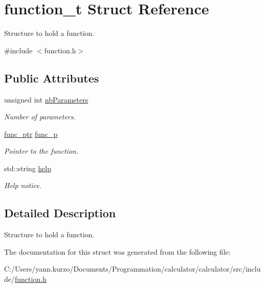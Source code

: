 \hypertarget{structfunction__t}{}\section{function\+\_\+t Struct Reference}
\label{structfunction__t}


Structure to hold a function.  




{\ttfamily \#include $<$function.\+h$>$}

\subsection*{Public Attributes}
\begin{DoxyCompactItemize}
\item 
\hypertarget{structfunction__t_a647add70a5264bc6bea452726cae9591}{}unsigned int \hyperlink{structfunction__t_a647add70a5264bc6bea452726cae9591}{nb\+Parameters}\label{structfunction__t_a647add70a5264bc6bea452726cae9591}

\begin{DoxyCompactList}\small\item\em Number of parameters. \end{DoxyCompactList}\item 
\hypertarget{structfunction__t_ab2d1eb30ebe6c02fdd6b10c1a2241f5a}{}\hyperlink{function_8h_a171e664ee3179d3d1f1a7b04a747724c}{func\+\_\+ptr} \hyperlink{structfunction__t_ab2d1eb30ebe6c02fdd6b10c1a2241f5a}{func\+\_\+p}\label{structfunction__t_ab2d1eb30ebe6c02fdd6b10c1a2241f5a}

\begin{DoxyCompactList}\small\item\em Pointer to the function. \end{DoxyCompactList}\item 
\hypertarget{structfunction__t_a8087fbf54eedd85f35f48dabdc83b228}{}std\+::string \hyperlink{structfunction__t_a8087fbf54eedd85f35f48dabdc83b228}{help}\label{structfunction__t_a8087fbf54eedd85f35f48dabdc83b228}

\begin{DoxyCompactList}\small\item\em Help notice. \end{DoxyCompactList}\end{DoxyCompactItemize}


\subsection{Detailed Description}
Structure to hold a function. 

The documentation for this struct was generated from the following file\+:\begin{DoxyCompactItemize}
\item 
C\+:/\+Users/yann.\+kurzo/\+Documents/\+Programmation/calculator/calculator/src/include/\hyperlink{function_8h}{function.\+h}\end{DoxyCompactItemize}

